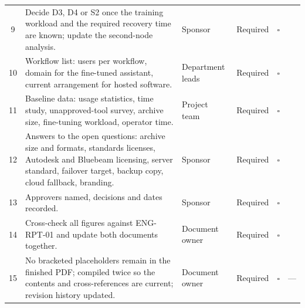 {\begin{xltabular}{\textwidth}{@{}c Y{1.5} Y{0.7} c c Y{0.8}@{}}
  9 & Decide D3, D4 or S2 once the training workload and the required recovery time are known; update the second-node analysis. & Sponsor & Required & $\square$ &  \\
  10 & Workflow list: users per workflow, domain for the fine-tuned assistant, current arrangement for hosted software. & Department leads & Required & $\square$ &  \\
  11 & Baseline data: usage statistics, time study, unapproved-tool survey, archive size, fine-tuning workload, operator time. & Project team & Required & $\square$ &  \\
  12 & Answers to the open questions: archive size and formats, standards licenses, Autodesk and Bluebeam licensing, server standard, failover target, backup copy, cloud fallback, branding. & Sponsor & Required & $\square$ &  \\
  13 & Approvers named, decisions and dates recorded. & Sponsor & Required & $\square$ &  \\
  14 & Cross-check all figures against ENG-RPT-01 and update both documents together. & Document owner & Required & $\square$ &  \\
  15 & No bracketed placeholders remain in the finished PDF; compiled twice so the contents and cross-references are current; revision history updated. & Document owner & Required & $\square$ & --- \\
  \bottomrule
\end{xltabular}}
